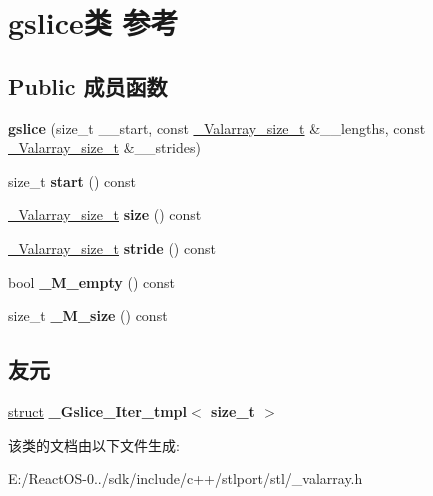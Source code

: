 \hypertarget{classgslice}{}\section{gslice类 参考}
\label{classgslice}
\subsection*{Public 成员函数}
\begin{DoxyCompactItemize}
\item 
\mbox{\label{classgslice_a42d3861ec2c582379dc8d1d9e669b328}} 
{\bfseries gslice} (size\+\_\+t \+\_\+\+\_\+start, const \hyperlink{classvalarray}{\+\_\+\+Valarray\+\_\+size\+\_\+t} \&\+\_\+\+\_\+lengths, const \hyperlink{classvalarray}{\+\_\+\+Valarray\+\_\+size\+\_\+t} \&\+\_\+\+\_\+strides)
\item 
\mbox{\label{classgslice_a3ad0659e9aea54dcb0a4f48d80cc085a}} 
size\+\_\+t {\bfseries start} () const
\item 
\mbox{\label{classgslice_ab765624721a587c00d6da80168d26464}} 
\hyperlink{classvalarray}{\+\_\+\+Valarray\+\_\+size\+\_\+t} {\bfseries size} () const
\item 
\mbox{\label{classgslice_aa9a7057a00dc10f1110e5388716d10ea}} 
\hyperlink{classvalarray}{\+\_\+\+Valarray\+\_\+size\+\_\+t} {\bfseries stride} () const
\item 
\mbox{\label{classgslice_ad614e724059a5be73b2e81950f973f7e}} 
bool {\bfseries \+\_\+\+M\+\_\+empty} () const
\item 
\mbox{\label{classgslice_a84660f8d96e9ceca6855789e3751c66b}} 
size\+\_\+t {\bfseries \+\_\+\+M\+\_\+size} () const
\end{DoxyCompactItemize}
\subsection*{友元}
\begin{DoxyCompactItemize}
\item 
\mbox{\label{classgslice_ad80823801c0da151ee39581f8901daad}} 
\hyperlink{interfacestruct}{struct} {\bfseries \+\_\+\+Gslice\+\_\+\+Iter\+\_\+tmpl$<$ size\+\_\+t $>$}
\end{DoxyCompactItemize}


该类的文档由以下文件生成\+:\begin{DoxyCompactItemize}
\item 
E\+:/\+React\+O\+S-\/0../sdk/include/c++/stlport/stl/\+\_\+valarray.\+h\end{DoxyCompactItemize}
